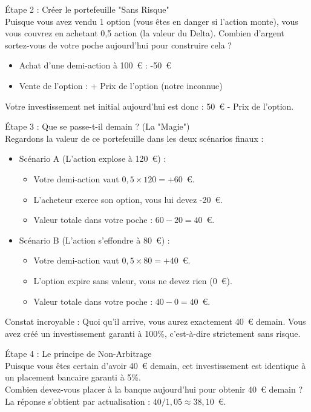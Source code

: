 \vspace{0.4cm}
Étape 2 : Créer le portefeuille "Sans Risque"\\
Puisque vous avez vendu 1 option (vous êtes en danger si l'action monte), vous vous couvrez en achetant 0,5 action (la valeur du Delta).
Combien d'argent sortez-vous de votre poche aujourd'hui pour construire cela ?
\begin{itemize}[label=$\rightarrow$]
    \item Achat d'une demi-action à 100~€ : -50~€
    \item Vente de l'option : + Prix de l'option (notre inconnue)
\end{itemize}
Votre investissement net initial aujourd'hui est donc : 50~€ - Prix de l'option.

\vspace{0.4cm}
Étape 3 : Que se passe-t-il demain ? (La "Magie")\\
Regardons la valeur de ce portefeuille dans les deux scénarios finaux :
\begin{itemize}[label=$\rightarrow$]
    \item Scénario A (L'action explose à 120~€) :
    \begin{itemize}[label=$\cdot$]
        \item Votre demi-action vaut $0,5 \times 120 = +60$~€.
        \item L'acheteur exerce son option, vous lui devez -20~€.
        \item Valeur totale dans votre poche : $60 - 20 = 40$~€.
    \end{itemize}
    \vspace{0.2cm}
    \item Scénario B (L'action s'effondre à 80~€) :
    \begin{itemize}[label=$\cdot$]
        \item Votre demi-action vaut $0,5 \times 80 = +40$~€.
        \item L'option expire sans valeur, vous ne devez rien (0~€).
        \item Valeur totale dans votre poche : $40 - 0 = 40$~€.
    \end{itemize}
\end{itemize}
Constat incroyable : Quoi qu'il arrive, vous aurez exactement 40~€ demain. Vous avez créé un investissement garanti à 100\%, c'est-à-dire strictement sans risque.

\vspace{0.4cm}
Étape 4 : Le principe de Non-Arbitrage\\
Puisque vous êtes certain d'avoir 40~€ demain, cet investissement est identique à un placement bancaire garanti à 5\%. \\
Combien devez-vous placer à la banque aujourd'hui pour obtenir 40~€ demain ? \\
La réponse s'obtient par actualisation : $40 / 1,05 \approx 38,10$~€.

